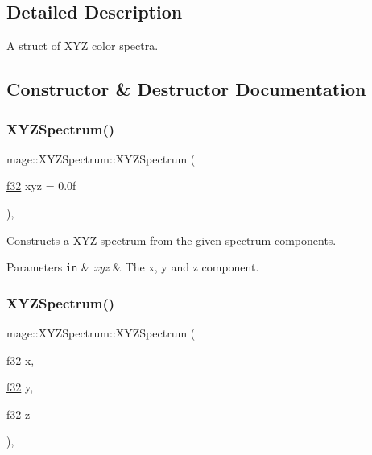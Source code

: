 \subsection{Detailed Description}
A struct of X\+YZ color spectra. 

\subsection{Constructor \& Destructor Documentation}
\hypertarget{structmage_1_1_x_y_z_spectrum_aada5f54df6899b1589237fed025e305e}{}\label{structmage_1_1_x_y_z_spectrum_aada5f54df6899b1589237fed025e305e} 
\subsubsection{\texorpdfstring{X\+Y\+Z\+Spectrum()}{XYZSpectrum()}\hspace{0.1cm}{\footnotesize\ttfamily [1/7]}}
{\footnotesize\ttfamily mage\+::\+X\+Y\+Z\+Spectrum\+::\+X\+Y\+Z\+Spectrum (\begin{DoxyParamCaption}\item[{\hyperlink{namespacemage_a6a44ad388483959dc4dff9f2aef91431}{f32}}]{xyz = {\ttfamily 0.0f} }\end{DoxyParamCaption})\hspace{0.3cm}{\ttfamily [explicit]}, {\ttfamily [noexcept]}}

Constructs a X\+YZ spectrum from the given spectrum components.


\begin{DoxyParams}[1]{Parameters}
\mbox{\tt in}  & {\em xyz} & The x, y and z component. \\
\hline
\end{DoxyParams}
\hypertarget{structmage_1_1_x_y_z_spectrum_a2bc776f3ee380d040f66ca3b8619d724}{}\label{structmage_1_1_x_y_z_spectrum_a2bc776f3ee380d040f66ca3b8619d724} 
\subsubsection{\texorpdfstring{X\+Y\+Z\+Spectrum()}{XYZSpectrum()}\hspace{0.1cm}{\footnotesize\ttfamily [2/7]}}
{\footnotesize\ttfamily mage\+::\+X\+Y\+Z\+Spectrum\+::\+X\+Y\+Z\+Spectrum (\begin{DoxyParamCaption}\item[{\hyperlink{namespacemage_a6a44ad388483959dc4dff9f2aef91431}{f32}}]{x,  }\item[{\hyperlink{namespacemage_a6a44ad388483959dc4dff9f2aef91431}{f32}}]{y,  }\item[{\hyperlink{namespacemage_a6a44ad388483959dc4dff9f2aef91431}{f32}}]{z }\end{DoxyParamCaption})\hspace{0.3cm}{\ttfamily [explicit]}, {\ttfamily [noexcept]}}

